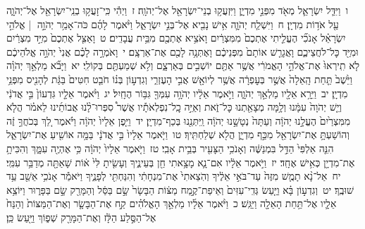 \documentclass[18pt]{article}
\begin{document}
 {\loc ו~}וַיִּדַּ֧ל יִשְׂרָאֵ֛ל מְאֹ֖ד מִפְּנֵ֣י מִדְיָ֑ן וַיִּזְעֲק֥וּ בְנֵי־יִשְׂרָאֵ֖ל אֶל־יְהֹוָֽה׃ \startlock
 {\loc ז~}וַיְהִ֕י כִּֽי־זָעֲק֥וּ בְנֵֽי־יִשְׂרָאֵ֖ל אֶל־יְהֹוָ֑ה עַ֖ל אֹד֥וֹת מִדְיָֽן׃ \startlock
 {\loc ח~}וַיִּשְׁלַ֧ח יְהֹוָ֛ה אִ֥ישׁ נָבִ֖יא אֶל־בְּנֵ֣י יִשְׂרָאֵ֑ל וַיֹּ֨אמֶר לָהֶ֜ם כֹּה־אָמַ֥ר יְהֹוָ֣ה  |  אֱלֹהֵ֣י יִשְׂרָאֵ֗ל אָנֹכִ֞י הֶעֱלֵ֤יתִי אֶתְכֶם֙ מִמִּצְרַ֔יִם וָאֹצִ֥יא אֶתְכֶ֖ם מִבֵּ֥ית עֲבָדִֽים׃ \startlock
 {\loc ט~}וָאַצִּ֤ל אֶתְכֶם֙ מִיַּ֣ד מִצְרַ֔יִם וּמִיַּ֖ד כׇּל־לֹחֲצֵיכֶ֑ם וָאֲגָרֵ֤שׁ אוֹתָם֙ מִפְּנֵיכֶ֔ם וָאֶתְּנָ֥ה לָכֶ֖ם אֶת־אַרְצָֽם׃ \startlock
 {\loc י~}וָאֹמְרָ֣ה לָכֶ֗ם אֲנִי֙ יְהֹוָ֣ה אֱלֹהֵיכֶ֔ם לֹ֤א תִֽירְאוּ֙ אֶת־אֱלֹהֵ֣י הָאֱמֹרִ֔י אֲשֶׁ֥ר אַתֶּ֖ם יוֹשְׁבִ֣ים בְּאַרְצָ֑ם וְלֹ֥א שְׁמַעְתֶּ֖ם בְּקוֹלִֽי׃ \startlock
 {\loc יא~}וַיָּבֹ֞א מַלְאַ֣ךְ יְהֹוָ֗ה וַיֵּ֙שֶׁב֙ תַּ֤חַת הָֽאֵלָה֙ אֲשֶׁ֣ר בְּעׇפְרָ֔ה אֲשֶׁ֥ר לְיוֹאָ֖שׁ אֲבִ֣י הָעֶזְרִ֑י וְגִדְע֣וֹן בְּנ֗וֹ חֹבֵ֤ט חִטִּים֙ בַּגַּ֔ת לְהָנִ֖יס מִפְּנֵ֥י מִדְיָֽן׃ \startlock
 {\loc יב~}וַיֵּרָ֥א אֵלָ֖יו מַלְאַ֣ךְ יְהֹוָ֑ה וַיֹּ֣אמֶר אֵלָ֔יו יְהֹוָ֥ה עִמְּךָ֖ גִּבּ֥וֹר הֶחָֽיִל׃ \startlock
 {\loc יג~}וַיֹּ֨אמֶר אֵלָ֤יו גִּדְעוֹן֙ בִּ֣י אֲדֹנִ֔י וְיֵ֤שׁ יְהֹוָה֙ עִמָּ֔נוּ וְלָ֥מָּה מְצָאַ֖תְנוּ כׇּל־זֹ֑את וְאַיֵּ֣ה כׇֽל־נִפְלְאֹתָ֡יו אֲשֶׁר֩ סִפְּרוּ־לָ֨נוּ אֲבוֹתֵ֜ינוּ לֵאמֹ֗ר הֲלֹ֤א מִמִּצְרַ֙יִם֙ הֶעֱלָ֣נוּ יְהֹוָ֔ה וְעַתָּה֙ נְטָשָׁ֣נוּ יְהֹוָ֔ה וַֽיִּתְּנֵ֖נוּ בְּכַף־מִדְיָֽן׃ \startlock
 {\loc יד~}וַיִּ֤פֶן אֵלָיו֙ יְהֹוָ֔ה וַיֹּ֗אמֶר לֵ֚ךְ בְּכֹחֲךָ֣ זֶ֔ה וְהוֹשַׁעְתָּ֥ אֶת־יִשְׂרָאֵ֖ל מִכַּ֣ף מִדְיָ֑ן הֲלֹ֖א שְׁלַחְתִּֽיךָ׃ \startlock
 {\loc טו~}וַיֹּ֤אמֶר אֵלָיו֙ בִּ֣י אֲדֹנָ֔י בַּמָּ֥ה אוֹשִׁ֖יעַ אֶת־יִשְׂרָאֵ֑ל הִנֵּ֤ה אַלְפִּי֙ הַדַּ֣ל בִּמְנַשֶּׁ֔ה וְאָנֹכִ֥י הַצָּעִ֖יר בְּבֵ֥ית אָבִֽי׃ \startlock
 {\loc טז~}וַיֹּ֤אמֶר אֵלָיו֙ יְהֹוָ֔ה כִּ֥י אֶהְיֶ֖ה עִמָּ֑ךְ וְהִכִּיתָ֥ אֶת־מִדְיָ֖ן כְּאִ֥ישׁ אֶחָֽד׃ \startlock
 {\loc יז~}וַיֹּ֣אמֶר אֵלָ֔יו אִם־נָ֛א מָצָ֥אתִי חֵ֖ן בְּעֵינֶ֑יךָ וְעָשִׂ֤יתָ לִּי֙ א֔וֹת שָׁאַתָּ֖ה מְדַבֵּ֥ר עִמִּֽי׃ \startlock
 {\loc יח~}אַל־נָ֨א תָמֻ֤שׁ מִזֶּה֙ עַד־בֹּאִ֣י אֵלֶ֔יךָ וְהֹֽצֵאתִי֙ אֶת־מִנְחָתִ֔י וְהִנַּחְתִּ֖י לְפָנֶ֑יךָ וַיֹּאמַ֕ר אָנֹכִ֥י אֵשֵׁ֖ב עַ֥ד שׁוּבֶֽךָ׃ \startlock
 {\loc יט~}וְגִדְע֣וֹן בָּ֗א וַיַּ֤עַשׂ גְּדִֽי־עִזִּים֙ וְאֵיפַת־קֶ֣מַח מַצּ֔וֹת הַבָּשָׂר֙ שָׂ֣ם בַּסַּ֔ל וְהַמָּרַ֖ק שָׂ֣ם בַּפָּר֑וּר וַיּוֹצֵ֥א אֵלָ֛יו אֶל־תַּ֥חַת הָאֵלָ֖ה וַיַּגַּֽשׁ׃ \startlock
 {\loc כ~}וַיֹּ֨אמֶר אֵלָ֜יו מַלְאַ֣ךְ הָאֱלֹהִ֗ים קַ֣ח אֶת־הַבָּשָׂ֤ר וְאֶת־הַמַּצּוֹת֙ וְהַנַּח֙ אֶל־הַסֶּ֣לַע הַלָּ֔ז וְאֶת־הַמָּרַ֖ק שְׁפ֑וֹךְ וַיַּ֖עַשׂ כֵּֽן׃ \startlock
\end{document}
